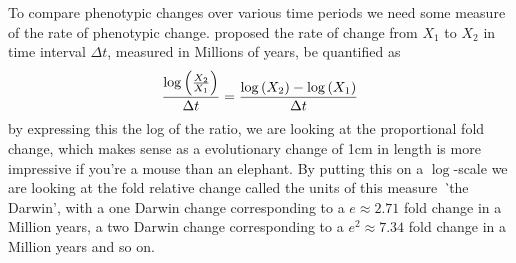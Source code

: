 To compare phenotypic changes over various time periods we need some measure of the rate of phenotypic
change. \citep{haldane1949suggestions} proposed the rate of change from
$X_1$ to $X_2$ in time interval $\Delta t$, measured in Millions of years, be quantified as
\begin{equation}
\frac{\log \left(\nicefrac{X_2}{X_1} \right) }{\Delta t}  = \frac{\log
  \left(X_2 \right) -\log \left(X_1 \right)  }{\Delta t} 
\end{equation}
by expressing this the log of the ratio, we are looking at the
proportional fold change, which makes sense as a
evolutionary change of 1cm in length is more impressive if you're a
mouse than an elephant. By putting this on a $\log$-scale we are
looking at the fold relative
change \citeauthor{haldane1949suggestions} called the
units of this measure {\emph`the Darwin'}, with a one Darwin change
corresponding to a $e\approx 2.71$
fold change in a Million years, a two Darwin change corresponding to a
$e^2\approx  7.34$ fold change in a Million years and so on. 

